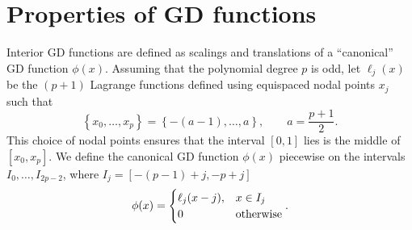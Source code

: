 \documentclass[preprint,10pt]{amsart}
\author{}
\title{}
\theoremstyle{lemma}
\theoremstyle{corollary}
\theoremstyle{theorem}
\newcommand{\LRc}[1]{\left\{ #1 \right\}}
\newcommand{\LRceil}[1]{\left\lceil #1 \right\rceil}
\begin{document}
\section{Properties of GD functions}

Interior GD functions are defined as scalings and translations of a ``canonical'' GD function $\phi(x)$.  Assuming that the polynomial degree $p$ is odd, let $\ell_j(x)$ be the $(p+1)$ Lagrange functions defined using equispaced nodal points $x_j$ such that
\[
\LRc{x_0,\ldots, x_p} = \LRc{-(a-1), \ldots, a}, \qquad a = \frac{p+1}{2}.%
\]
This choice of nodal points ensures that the interval $[0,1]$ lies is the middle of $[x_0, x_p]$.  We define the canonical GD function $\phi(x)$ piecewise on the intervals $I_0,\ldots, I_{2p-2}$, where $I_j = [-(p-1)+j,-p+j]$
\[
\phi(x) = \begin{cases}
\ell_j(x-j), & x \in I_j\\
0 & {\rm otherwise}
\end{cases}.
\]
\end{document}
